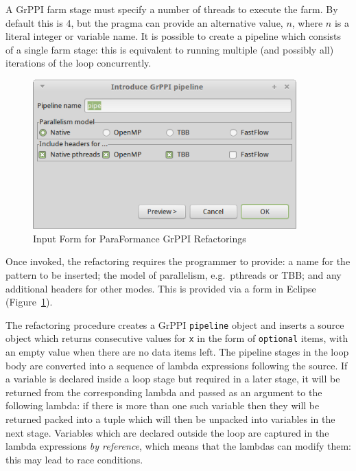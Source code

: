 A GrPPI farm stage must specify a number of threads to execute the farm.
By default this is 4, but the pragma can provide an alternative value, $n$, where $n$ is a literal integer or variable name.
%
It is possible to create a pipeline which consists of a single
farm stage: this is equivalent to running multiple (and possibly all)
iterations of the loop concurrently.


\begin{figure}
\centering
\includegraphics[width=4in]{figures/InputForm.png}
\caption{Input Form for ParaFormance GrPPI Refactorings}
\label{fig:inputform}
\end{figure}

Once invoked, the refactoring requires the programmer to provide: a name for the pattern to be inserted; the model of parallelism, e.g.\ pthreads or TBB; and any additional headers for other modes. This is provided via a form in Eclipse (Figure~\ref{fig:inputform}).

The refactoring procedure creates a GrPPI \texttt{pipeline} object and
inserts a source object which returns consecutive values for \texttt{x}
in the form of \texttt{optional} items, with an empty value when there
are no data items left.
%
The pipeline stages in the loop body are converted into a sequence of
lambda expressions following the source. If a variable is declared
inside a loop stage but required in a later stage, it will be returned
from the corresponding lambda and passed as an argument to the following
lambda: if there is more than one such variable then they will be
returned packed into a tuple which will then be unpacked into variables
in the next stage.
%
Variables which are declared outside the loop are captured in the lambda
expressions \emph{by reference}, which means that the lambdas can modify
them: this may lead to race conditions.

